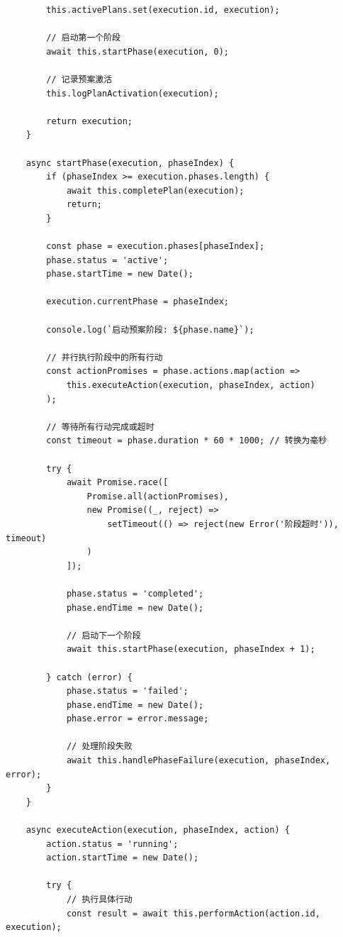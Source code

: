 \begin{lstlisting}
        this.activePlans.set(execution.id, execution);
        
        // 启动第一个阶段
        await this.startPhase(execution, 0);
        
        // 记录预案激活
        this.logPlanActivation(execution);
        
        return execution;
    }
    
    async startPhase(execution, phaseIndex) {
        if (phaseIndex >= execution.phases.length) {
            await this.completePlan(execution);
            return;
        }
        
        const phase = execution.phases[phaseIndex];
        phase.status = 'active';
        phase.startTime = new Date();
        
        execution.currentPhase = phaseIndex;
        
        console.log(`启动预案阶段: ${phase.name}`);
        
        // 并行执行阶段中的所有行动
        const actionPromises = phase.actions.map(action => 
            this.executeAction(execution, phaseIndex, action)
        );
        
        // 等待所有行动完成或超时
        const timeout = phase.duration * 60 * 1000; // 转换为毫秒
        
        try {
            await Promise.race([
                Promise.all(actionPromises),
                new Promise((_, reject) => 
                    setTimeout(() => reject(new Error('阶段超时')), timeout)
                )
            ]);
            
            phase.status = 'completed';
            phase.endTime = new Date();
            
            // 启动下一个阶段
            await this.startPhase(execution, phaseIndex + 1);
            
        } catch (error) {
            phase.status = 'failed';
            phase.endTime = new Date();
            phase.error = error.message;
            
            // 处理阶段失败
            await this.handlePhaseFailure(execution, phaseIndex, error);
        }
    }
    
    async executeAction(execution, phaseIndex, action) {
        action.status = 'running';
        action.startTime = new Date();
        
        try {
            // 执行具体行动
            const result = await this.performAction(action.id, execution);
            

\end{lstlisting}
